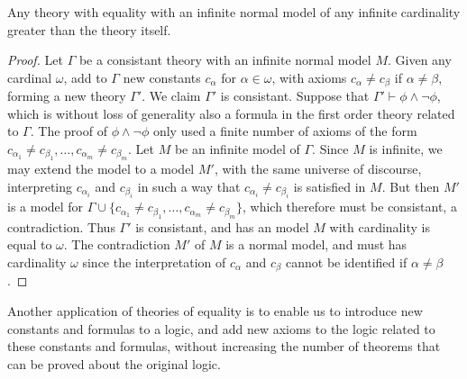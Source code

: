 \begin{corollary}
    Any theory with equality with an infinite normal model of any infinite cardinality greater than the theory itself.
\end{corollary}
\begin{proof}
    Let $\Gamma$ be a consistant theory with an infinite normal model $M$. Given any cardinal $\omega$, add to $\Gamma$ new constants $c_\alpha$ for $\alpha \in \omega$, with axioms $c_\alpha \neq c_\beta$ if $\alpha \neq \beta$, forming a new theory $\Gamma'$. We claim $\Gamma'$ is consistant. Suppose that $\Gamma' \vdash \phi \wedge \neg \phi$, which is without loss of generality also a formula in the first order theory related to $\Gamma$. The proof of $\phi \wedge \neg \phi$ only used a finite number of axioms of the form $c_{\alpha_1} \neq c_{\beta_1}, \dots, c_{\alpha_m} \neq c_{\beta_m}$. Let $M$ be an infinite model of $\Gamma$. Since $M$ is infinite, we may extend the model to a model $M'$, with the same universe of discourse, interpreting $c_{\alpha_i}$ and $c_{\beta_i}$ in such a way that $c_{\alpha_i} \neq c_{\beta_i}$ is satisfied in $M$. But then $M'$ is a model for $\Gamma \cup \{ c_{\alpha_1} \neq c_{\beta_1}, \dots, c_{\alpha_m} \neq c_{\beta_m} \}$, which therefore must be consistant, a contradiction. Thus $\Gamma'$ is consistant, and has an model $M$ with cardinality is equal to $\omega$. The contradiction $M'$ of $M$ is a normal model, and must has cardinality $\omega$ since the interpretation of $c_\alpha$ and $c_\beta$ cannot be identified if $\alpha \neq \beta$.
\end{proof}

Another application of theories of equality is to enable us to introduce new constants and formulas to a logic, and add new axioms to the logic related to these constants and formulas, without increasing the number of theorems that can be proved about the original logic.

